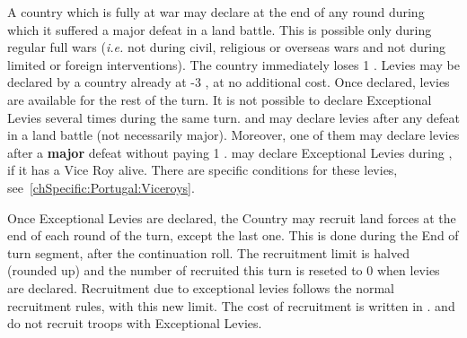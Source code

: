 \bparag A country which is fully at war may declare 
at the end of any round during which it suffered a major defeat in a land
battle. This is possible only during regular full wars (\emph{i.e.} not during
civil, religious or overseas wars and not during limited or foreign
interventions).
\bparag The country immediately loses 1 \STAB. Levies may be declared by a
country already at -3 \STAB, at no additional cost.
\bparag Once declared, levies are available for the rest of the turn. It is
not possible to declare Exceptional Levies several times during the same
turn.
\bparag[Exception:] \SUE and \PRU may declare levies after any defeat in a land
battle (not necessarily major). Moreover, one of them may declare levies after
a \textbf{major} defeat without paying 1 \STAB.
\bparag[Exception:] \POR may declare Exceptional Levies during , if it has a Vice Roy alive. There are specific conditions for these
levies, see~\ref{chSpecific:Portugal:Viceroys}.

\bparag Once Exceptional Levies are declared, the Country may recruit land
forces at the end of each round of the turn, except the last one. This is done
during the End of turn segment, after the continuation roll.
\bparag The recruitment limit is halved (rounded up) and the number of \LD
recruited this turn is reseted to 0 when levies are declared.
\bparag Recruitment due to exceptional levies follows the normal recruitment
rules, with this new limit.
\bparag The cost of recruitment is written in .
\bparag \SUE and \PRU do not recruit  troops with Exceptional
Levies.

